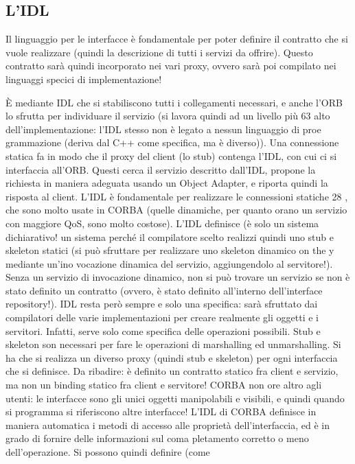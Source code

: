 \subsection{L'IDL}
Il linguaggio per le interfacce è fondamentale per poter definire il contratto che
si vuole realizzare (quindi la descrizione di tutti i servizi da offrire). Questo
contratto sarà quindi incorporato nei vari proxy, ovvero sarà poi compilato nei
linguaggi specici di implementazione!

È mediante IDL che si stabiliscono tutti i collegamenti necessari, e anche
l'ORB lo sfrutta per individuare il servizio (si lavora quindi ad un livello più
63
alto dell'implementazione: l'IDL stesso non è legato a nessun linguaggio di proe
grammazione (deriva dal C++ come specifica, ma è diverso)). Una connessione
statica fa in modo che il proxy del client (lo stub) contenga l'IDL, con cui ci
si interfaccia all'ORB. Questi cerca il servizio descritto dall'IDL, propone la
richiesta in maniera adeguata usando un Object Adapter, e riporta quindi la
risposta al client.
L'IDL è fondamentale per realizzare le connessioni statiche 28 , che sono molto
usate in CORBA (quelle dinamiche, per quanto orano un servizio con maggiore
QoS, sono molto costose). L'IDL definisce (è solo un sistema dichiarativo! un
sistema perché il compilatore scelto realizzi quindi uno stub e skeleton statici
(si può sfruttare per realizzare uno skeleton dinamico on the y mediante un'ino
vocazione dinamica del servizio, aggiungendolo al servitore!). Senza un servizio
di invocazione dinamico, non si può trovare un servizio se non è stato definito
un contratto (ovvero, è stato definito all'interno dell'interface repository!).
IDL resta però sempre e solo una specifica: sarà sfruttato dai compilatori
delle varie implementazioni per creare realmente gli oggetti e i servitori. Infatti,
serve solo come specifica delle operazioni possibili.
Stub e skeleton son necessari per fare le operazioni di marshalling ed unmarshalling. Si ha che si realizza un diverso
proxy (quindi stub e skeleton) per ogni
interfaccia che si definisce.
Da ribadire: è definito un contratto statico fra client e servizio, ma non un
binding statico fra client e servitore!
CORBA non ore altro agli utenti: le interfacce sono gli unici oggetti manipolabili e visibili, e quindi quando si
programma si riferiscono altre interfacce!
L'IDL di CORBA definisce in maniera automatica i metodi di accesso alle
proprietà dell'interfaccia, ed è in grado di fornire delle informazioni sul coma
pletamento corretto o meno dell'operazione. Si possono quindi definire (come
